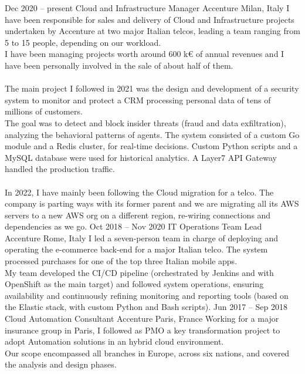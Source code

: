 \documentclass[9pt]{developercv}
\begin{document}
\begin{entrylist}
	\entry
		{Dec 2020 -- present}
		{Cloud and Infrastructure Manager}
		{Accenture}
		{Milan, Italy}
		{
			I have been responsible for sales and delivery of Cloud and Infrastructure projects undertaken by Accenture at two major Italian telcos, leading a team ranging from 5 to 15 people, depending on our workload.
			\\
			I have been managing projects worth around 600 k€ of annual revenues and I have been personally involved in the sale of about half of them.
			\\
			\\
			The main project I followed in 2021 was the design and development of a security system to monitor and protect a CRM processing personal data of tens of millions of customers.
			\\
			The goal was to detect and block insider threats (fraud and data exfiltration), analyzing the behavioral patterns of agents.
			The system consisted of a custom Go module and a Redis cluster, for real-time decisions. Custom Python scripts and a MySQL database were used for historical analytics. A Layer7 API Gateway handled the production traffic.
			\\
			\\
			In 2022, I have mainly been following the Cloud migration for a telco. The company is parting ways with its former parent and we are migrating all its AWS servers to a new AWS org on a different region, re-wiring connections and dependencies as we go.
		}
	\entry
		{Oct 2018 -- Nov 2020}
		{IT Operations Team Lead}
		{Accenture}
		{Rome, Italy}
		{
			I led a seven-person team in charge of deploying and operating the e-commerce back-end for a major Italian telco. The system processed purchases for one of the top three Italian mobile apps.
			\\
			My team developed the CI/CD pipeline (orchestrated by Jenkins and with OpenShift as the main target) and followed system operations, ensuring availability and continuously refining monitoring and reporting tools (based on the Elastic stack, with custom Python and Bash scripts).
		}
	\entry
		{Jun 2017 -- Sep 2018}
		{Cloud Automation Consultant}
		{Accenture}
		{Paris, France}
		{
			Working for a major insurance group in Paris, I followed as PMO a key transformation project to adopt Automation solutions in an hybrid cloud environment.
			\\
			Our scope encompassed all branches in Europe, across six nations, and covered the analysis and design phases.
}
\end{entrylist}
\end{document}
